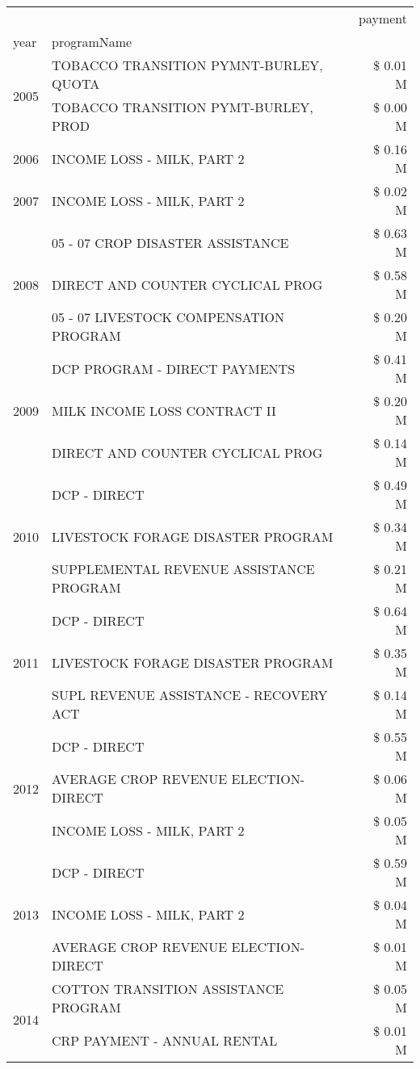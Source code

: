 \begin{tabular}{llr}
\toprule
 &  & payment \\
year & programName &  \\
\midrule
\multirow[t]{2}{*}{2005} & TOBACCO TRANSITION PYMNT-BURLEY, QUOTA & \$ 0.01 M \\
 & TOBACCO TRANSITION PYMT-BURLEY, PROD & \$ 0.00 M \\
\cline{1-3}
2006 & INCOME LOSS - MILK, PART 2 & \$ 0.16 M \\
\cline{1-3}
2007 & INCOME LOSS - MILK, PART 2 & \$ 0.02 M \\
\cline{1-3}
\multirow[t]{3}{*}{2008} & 05 - 07 CROP DISASTER ASSISTANCE & \$ 0.63 M \\
 & DIRECT AND COUNTER CYCLICAL PROG & \$ 0.58 M \\
 & 05 - 07 LIVESTOCK COMPENSATION PROGRAM & \$ 0.20 M \\
\cline{1-3}
\multirow[t]{3}{*}{2009} & DCP PROGRAM - DIRECT PAYMENTS & \$ 0.41 M \\
 & MILK INCOME LOSS CONTRACT II & \$ 0.20 M \\
 & DIRECT AND COUNTER CYCLICAL PROG & \$ 0.14 M \\
\cline{1-3}
\multirow[t]{3}{*}{2010} & DCP - DIRECT & \$ 0.49 M \\
 & LIVESTOCK FORAGE DISASTER PROGRAM & \$ 0.34 M \\
 & SUPPLEMENTAL REVENUE ASSISTANCE PROGRAM & \$ 0.21 M \\
\cline{1-3}
\multirow[t]{3}{*}{2011} & DCP - DIRECT & \$ 0.64 M \\
 & LIVESTOCK FORAGE DISASTER PROGRAM & \$ 0.35 M \\
 & SUPL REVENUE ASSISTANCE - RECOVERY ACT & \$ 0.14 M \\
\cline{1-3}
\multirow[t]{3}{*}{2012} & DCP - DIRECT & \$ 0.55 M \\
 & AVERAGE CROP REVENUE ELECTION-DIRECT & \$ 0.06 M \\
 & INCOME LOSS - MILK, PART 2 & \$ 0.05 M \\
\cline{1-3}
\multirow[t]{3}{*}{2013} & DCP - DIRECT & \$ 0.59 M \\
 & INCOME LOSS - MILK, PART 2 & \$ 0.04 M \\
 & AVERAGE CROP REVENUE ELECTION-DIRECT & \$ 0.01 M \\
\cline{1-3}
\multirow[t]{3}{*}{2014} & COTTON TRANSITION ASSISTANCE PROGRAM & \$ 0.05 M \\
 & CRP PAYMENT - ANNUAL RENTAL & \$ 0.01 M \\

\end{tabular}
